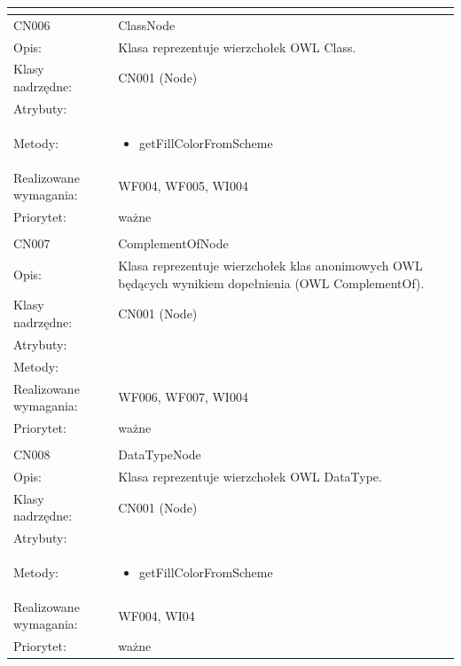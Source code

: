\documentclass[a4paper,10pt]{article}
\begin{document}
\begin{center}
\begin{longtable}{|m{3cm}|m{9cm}|}
\multicolumn{2}{c}{} \\
 \hline

CN006 & ClassNode \\ \hline
Opis: & Klasa reprezentuje wierzchołek OWL Class.    \\ \hline
Klasy nadrzędne: & CN001 (Node)       \\ \hline
Atrybuty: & %
 \\ \hline
Metody: & \begin{itemize}
 \item getFillColorFromScheme
\end{itemize}
  \\ \hline
Realizowane wymagania: & WF004, WF005, WI004 \\ \hline
Priorytet: & ważne  \\ \hline

\multicolumn{2}{c}{} \\
 \hline

CN007 & ComplementOfNode \\ \hline
Opis: & Klasa reprezentuje wierzchołek klas anonimowych OWL będących wynikiem dopełnienia (OWL ComplementOf).    \\ \hline
Klasy nadrzędne: & CN001 (Node)       \\ \hline
Atrybuty: & %
 \\ \hline
Metody: & %
  \\ \hline
Realizowane wymagania: & WF006, WF007, WI004 \\ \hline
Priorytet: & ważne  \\ \hline

\multicolumn{2}{c}{} \\
 \hline

CN008 & DataTypeNode \\ \hline
Opis: & Klasa reprezentuje wierzchołek OWL DataType.    \\ \hline
Klasy nadrzędne: & CN001 (Node)       \\ \hline
Atrybuty: & %
 \\ \hline
Metody: & \begin{itemize}
 \item getFillColorFromScheme
\end{itemize}
  \\ \hline
Realizowane wymagania: & WF004, WI04 \\ \hline
Priorytet: & ważne  \\ \hline


\end{longtable}
\end{center}
\end{document}

